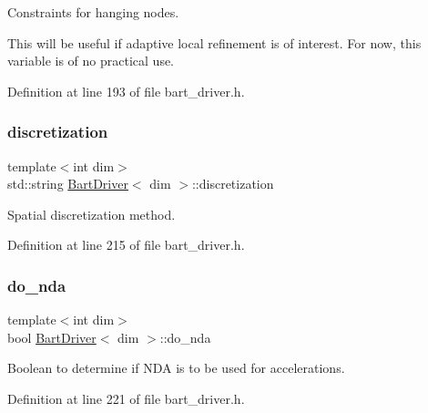 Constraints for hanging nodes. 

This will be useful if adaptive local refinement is of interest. For now, this variable is of no practical use. 

Definition at line 193 of file bart\+\_\+driver.\+h.

\mbox{\label{class_bart_driver_a75cc884c6895beca3d3861ca226b4a3f}} 
\subsubsection{\texorpdfstring{discretization}{discretization}}
{\footnotesize\ttfamily template$<$int dim$>$ \\
std\+::string \hyperlink{class_bart_driver}{Bart\+Driver}$<$ dim $>$\+::discretization\hspace{0.3cm}{\ttfamily [private]}}



Spatial discretization method. 



Definition at line 215 of file bart\+\_\+driver.\+h.

\mbox{\label{class_bart_driver_acb7aa4c65a18deef5e1be7a3477d1b12}} 
\subsubsection{\texorpdfstring{do\+\_\+nda}{do\_nda}}
{\footnotesize\ttfamily template$<$int dim$>$ \\
bool \hyperlink{class_bart_driver}{Bart\+Driver}$<$ dim $>$\+::do\+\_\+nda\hspace{0.3cm}{\ttfamily [private]}}



Boolean to determine if N\+DA is to be used for accelerations. 



Definition at line 221 of file bart\+\_\+driver.\+h.

\mbox{\label{class_bart_driver_a102ccb2fc2ea225bc75f757214152c1b}} 
